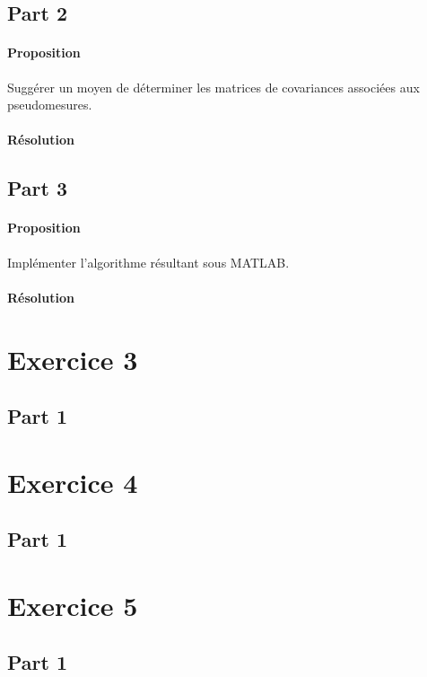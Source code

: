 \documentclass{article}
\begin{document}
\subsection{Part 2}
\paragraph{Proposition}Suggérer un moyen de déterminer les matrices de covariances associées aux pseudomesures.

\paragraph{Résolution}

\subsection{Part 3}
\paragraph{Proposition}Implémenter l'algorithme résultant sous MATLAB.

\paragraph{Résolution}




\section{Exercice 3}
\subsection{Part 1}


\section{Exercice 4}
\subsection{Part 1}


\section{Exercice 5}
\subsection{Part 1}
\end{document}
